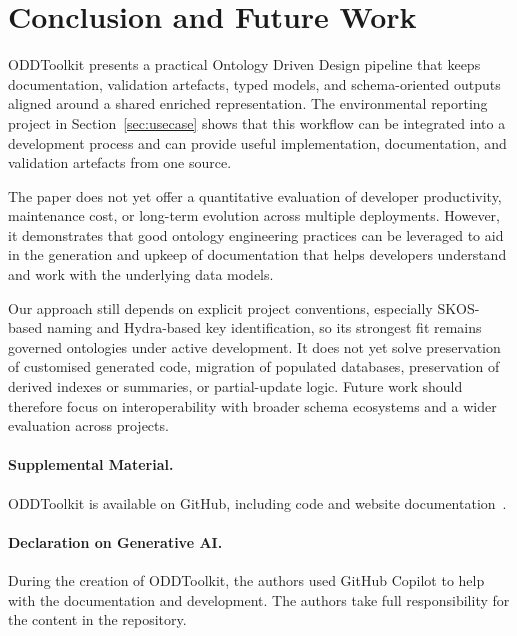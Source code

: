 \section{Conclusion and Future Work} \label{sec:conclusion}
ODDToolkit presents a practical Ontology Driven Design pipeline that keeps documentation, validation artefacts, typed models, and schema-oriented outputs aligned around a shared enriched representation. The environmental reporting project in Section~\ref{sec:usecase} shows that this workflow can be integrated into a development process and can provide useful implementation, documentation, and validation artefacts from one source.

The paper does not yet offer a quantitative evaluation of developer productivity, maintenance cost, or long-term evolution across multiple deployments. However, it demonstrates that good ontology engineering practices can be leveraged to aid in the generation and upkeep of documentation that helps developers understand and work with the underlying data models.

Our approach still depends on explicit project conventions, especially SKOS-based naming and Hydra-based key identification, so its strongest fit remains governed ontologies under active development. It does not yet solve preservation of customised generated code, migration of populated databases, preservation of derived indexes or summaries, or partial-update logic. Future work should therefore focus on interoperability with broader schema ecosystems and a wider evaluation across projects.

\paragraph{Supplemental Material.}
ODDToolkit is available on GitHub, including code and website documentation~\cite{oddtoolkit2026}.

\paragraph*{Declaration on Generative AI.}
During the creation of ODDToolkit, the authors used GitHub Copilot to help with the documentation and development. The authors take full responsibility for the content in the repository.